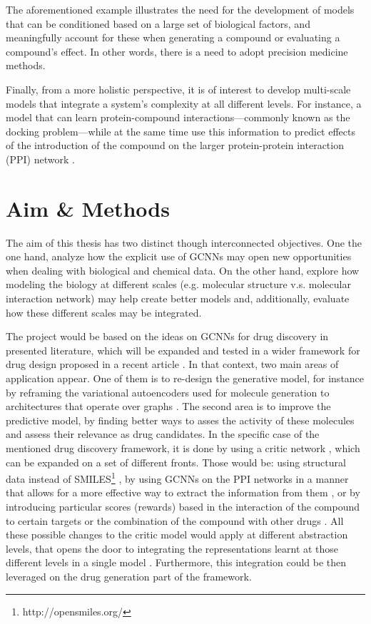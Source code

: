 \documentclass{article}
\begin{document}
The aforementioned example illustrates the need for the development of models that can
 be conditioned based on a large set of biological factors, and meaningfully account for
 these when generating a compound or evaluating a compound's effect. In other words,
 there is a need to adopt precision medicine methods.

Finally, from a more holistic perspective, it is of interest to develop multi-scale
 models that integrate a system's complexity at all different levels. For instance, a
 model that can learn protein-compound interactions---commonly known as the docking
 problem---while at the same time use this information to predict effects of the
 introduction of the compound on the larger protein-protein interaction (PPI) network
 \cite{Sun2019}.


    \section*{Aim \& Methods}


The aim of this thesis has two distinct though interconnected objectives. One the one
 hand, analyze how the explicit use of GCNNs may open new opportunities when dealing
 with biological and chemical data. On the other hand, explore how modeling the biology
 at different scales (e.g. molecular structure v.s. molecular interaction network) may
 help create better models and, additionally, evaluate how these different scales may be
 integrated.

The project would be based on the ideas on GCNNs for drug discovery in presented
 literature\cite{Sun2019}, which will be expanded and tested in a wider framework for
 drug design proposed in a recent article \cite{Born2019}. In that context, two main
 areas of application appear. One of them is to re-design the generative model, for
 instance by reframing the variational autoencoders used for molecule generation to
 architectures that operate over graphs \cite{Simonovsky2018,Li2018, Li2018a}. The
 second area is to improve the predictive model, by finding better ways to asses the
 activity of these molecules and assess their relevance as drug candidates. In the
 specific case of the mentioned drug discovery framework, it is done by using a critic
 network \cite{Manica2019}, which can be expanded on a set of different fronts. Those
 would be: using structural data instead of SMILES\footnote{http://opensmiles.org/}
 \cite{Li, Do2019}, {\color{red} by using GCNNs on the PPI networks in a manner that
 allows for a more effective way to extract the information from them} \cite{Oskooei2019,
 Wang2019}, or by introducing particular scores (rewards) based in the interaction of
 the compound to certain targets \cite{YingkaiGao2018, Zhavoronkov2019} or the
 combination of the compound with other drugs \cite{Zitnik2018}. All these possible
 changes to the critic model would apply at different abstraction levels, that opens the
 door to integrating the representations learnt at those different levels in a single
 model \cite{Ying2018, Ma2019, Huang2019}. Furthermore, this integration could be then
 leveraged on the drug generation part of the framework.
\end{document}
